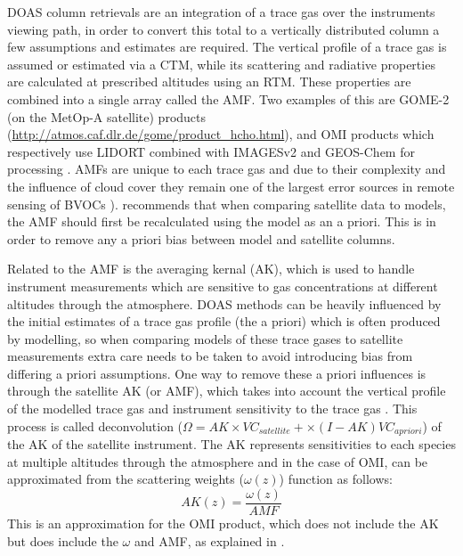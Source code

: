     DOAS column retrievals are an integration of a trace gas over the instruments viewing path, in order to convert this total to a vertically distributed column a few assumptions and estimates are required. 
    The vertical profile of a trace gas is assumed or estimated via a CTM, while its scattering and radiative properties are calculated at prescribed altitudes using an RTM. 
    These properties are combined into a single array called the AMF.
    Two examples of this are GOME-2 (on the MetOp-A satellite) products (\url{http://atmos.caf.dlr.de/gome/product_hcho.html}), and OMI products which respectively use LIDORT combined with IMAGESv2 and GEOS-Chem for processing \parencite{Chance2002, Abad2015}.
    AMFs are unique to each trace gas and due to their complexity and the influence of cloud cover they remain one of the largest error sources in remote sensing of BVOCs \parencite{Palmer2001,Millet2006}).
    \textcite{Lamsal2014} recommends that when comparing satellite data to models, the AMF should first be recalculated using the model as an a priori.
    This is in order to remove any a priori bias between model and satellite columns.
    
    Related to the AMF is the averaging kernal (AK), which is used to handle instrument measurements which are sensitive to gas concentrations at different altitudes through the atmosphere.
    DOAS methods can be heavily influenced by the initial estimates of a trace gas profile (the a priori) which is often produced by modelling, so when comparing models of these trace gases to satellite measurements extra care needs to be taken to avoid introducing bias from differing a priori assumptions.
    One way to remove these a priori influences is through the satellite AK (or AMF), which takes into account the vertical profile of the modelled trace gas and instrument sensitivity to the trace gas \parencite{Eskes2003, Palmer2001}.
    This process is called deconvolution ($\Omega = AK \times VC_{satellite} + \times (I - AK) VC_{a priori}$) of the AK of the satellite instrument.
    The AK represents sensitivities to each species at multiple altitudes through the atmosphere and in the case of OMI, can be approximated from the scattering weights ($\omega(z)$) function as follows:
    \begin{equation} \label{ch_HCHO:eqn:AKfromw}
    AK(z) = \frac{\omega(z)}{AMF}
    \end{equation}
    This is an approximation for the OMI product, which does not include the AK but does include the $\omega$ and AMF, as explained in \textcite{Abad2015}.
  
